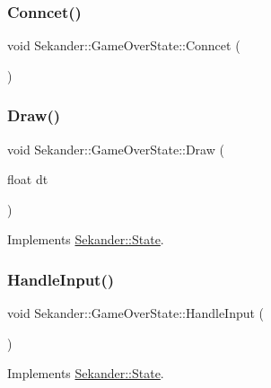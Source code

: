 \subsubsection{\texorpdfstring{Conncet()}{Conncet()}}
{\footnotesize\ttfamily void Sekander\+::\+Game\+Over\+State\+::\+Conncet (\begin{DoxyParamCaption}{ }\end{DoxyParamCaption})\hspace{0.3cm}{\ttfamily [inline]}}

\mbox{\label{classSekander_1_1GameOverState_af2407df4e95d8add41ed995157bc0905}} 
\subsubsection{\texorpdfstring{Draw()}{Draw()}}
{\footnotesize\ttfamily void Sekander\+::\+Game\+Over\+State\+::\+Draw (\begin{DoxyParamCaption}\item[{float}]{dt }\end{DoxyParamCaption})\hspace{0.3cm}{\ttfamily [virtual]}}



Implements \hyperlink{classSekander_1_1State_a6ae7c2de1985461232a3ad694ca736b5}{Sekander\+::\+State}.

\mbox{\label{classSekander_1_1GameOverState_ade27fc3af036b3c50df4ccf6cb795627}} 
\subsubsection{\texorpdfstring{Handle\+Input()}{HandleInput()}}
{\footnotesize\ttfamily void Sekander\+::\+Game\+Over\+State\+::\+Handle\+Input (\begin{DoxyParamCaption}{ }\end{DoxyParamCaption})\hspace{0.3cm}{\ttfamily [virtual]}}



Implements \hyperlink{classSekander_1_1State_ad55ae42f5887db5745fda9f2bd30aaa3}{Sekander\+::\+State}.


